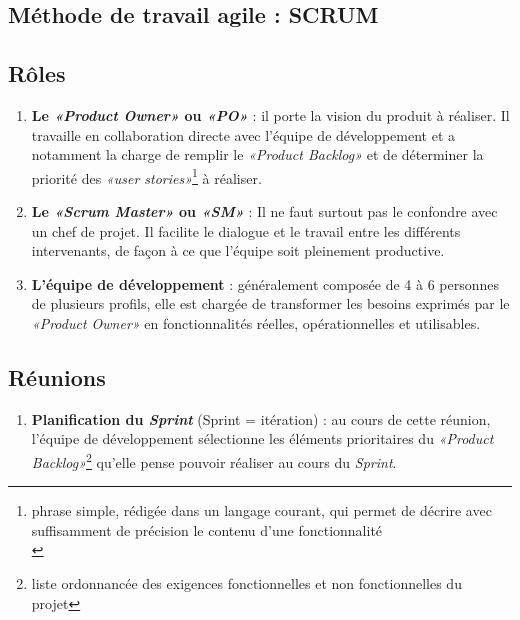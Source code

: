 \renewcommand{\thesection}{\Alph{section}}

\setcounter{section}{0}

\begin{appendices}%
\appendixheaderon

\section{Méthode de travail agile : SCRUM}
\label{ann:annexe1}
\subsection{Rôles}
\begin{enumerate}[parsep=0cm,itemsep=0cm]
\item \textbf{ Le \textit{«Product Owner»} ou \textit{«PO»} }: il porte la vision du produit à réaliser. Il travaille en collaboration directe avec l’équipe de développement et a notamment la charge de remplir le\textit{ «Product Backlog»} et de déterminer la priorité des \textit{«user stories»}\footnote{phrase simple, rédigée dans un langage courant, qui permet de décrire avec suffisamment de précision le contenu d’une fonctionnalité\\} à réaliser. 

\item \textbf{Le \textit{«Scrum Master»} ou \textit{«SM»}} : Il ne faut surtout pas le confondre avec un chef de projet. Il facilite le dialogue et le travail entre les différents intervenants, de façon à ce que l’équipe soit pleinement productive. 

\item \textbf{L’équipe de développement} : généralement composée de 4 à 6 personnes de plusieurs profils, elle est chargée de transformer les besoins exprimés par le \textit{«Product Owner»}  en fonctionnalités réelles, opérationnelles et utilisables. 
\end{enumerate}

\subsection{Réunions}
\begin{enumerate}[parsep=0cm,itemsep=0cm]
\item \textbf{Planification du \textit{Sprint}} (Sprint = itération) : au cours de cette réunion, l'équipe de développement sélectionne les éléments prioritaires du \textit{«Product Backlog»}\footnote{liste ordonnancée des exigences fonctionnelles et non fonctionnelles du projet} qu'elle pense pouvoir réaliser au cours du \textit{Sprint}.


\end{enumerate}
\end{appendices}
